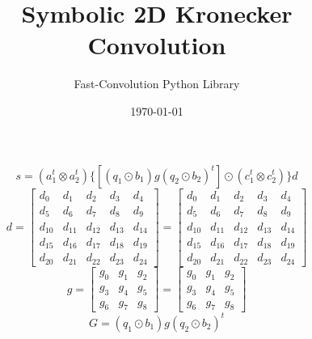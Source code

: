 \documentclass{article}%
\title{Symbolic 2D Kronecker Convolution}%
\author{Fast{-}Convolution Python Library}%
\date{\today}%
\begin{document}
%
\normalsize%
\maketitle%
\[%
s=(a_1^t \otimes a_2^t) \{[(q_1 \odot b_1) g (q_2 \odot b_2)^t] \odot (c_1^t \otimes c_2^t)\} d%
\]%
\[%
d = \left[\begin{matrix}d_{0} & d_{1} & d_{2} & d_{3} & d_{4}\\d_{5} & d_{6} & d_{7} & d_{8} & d_{9}\\d_{10} & d_{11} & d_{12} & d_{13} & d_{14}\\d_{15} & d_{16} & d_{17} & d_{18} & d_{19}\\d_{20} & d_{21} & d_{22} & d_{23} & d_{24}\end{matrix}\right] = \left[\begin{matrix}d_{0} & d_{1} & d_{2} & d_{3} & d_{4}\\d_{5} & d_{6} & d_{7} & d_{8} & d_{9}\\d_{10} & d_{11} & d_{12} & d_{13} & d_{14}\\d_{15} & d_{16} & d_{17} & d_{18} & d_{19}\\d_{20} & d_{21} & d_{22} & d_{23} & d_{24}\end{matrix}\right]%
\]%
\[%
g = \left[\begin{matrix}g_{0} & g_{1} & g_{2}\\g_{3} & g_{4} & g_{5}\\g_{6} & g_{7} & g_{8}\end{matrix}\right] = \left[\begin{matrix}g_{0} & g_{1} & g_{2}\\g_{3} & g_{4} & g_{5}\\g_{6} & g_{7} & g_{8}\end{matrix}\right]%
\]%
\[%
G = (q_1 \odot b_1) g (q_2 \odot b_2)^t%
\]%
\end{document}
